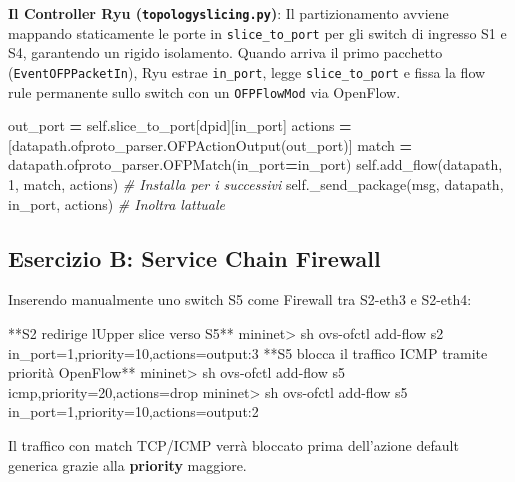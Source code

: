 \documentclass[
  italian,
  openany]{book}
\newenvironment{Shaded}{\begin{snugshade}}{\end{snugshade}}
\newcommand{\CommentTok}[1]{\textcolor[rgb]{0.56,0.35,0.01}{\textit{#1}}}
\newcommand{\DecValTok}[1]{\textcolor[rgb]{0.00,0.00,0.81}{#1}}
\newcommand{\ExtensionTok}[1]{#1}
\newcommand{\NormalTok}[1]{#1}
\newcommand{\OperatorTok}[1]{\textcolor[rgb]{0.81,0.36,0.00}{\textbf{#1}}}
\newcommand{\StringTok}[1]{\textcolor[rgb]{0.31,0.60,0.02}{#1}}
\newcommand{\VariableTok}[1]{\textcolor[rgb]{0.00,0.00,0.00}{#1}}
\begin{document}
\textbf{Il Controller Ryu (\texttt{topologyslicing.py})}: Il
partizionamento avviene mappando staticamente le porte in
\texttt{slice\_to\_port} per gli switch di ingresso S1 e S4, garantendo
un rigido isolamento. Quando arriva il primo pacchetto
(\texttt{EventOFPPacketIn}), Ryu estrae \texttt{in\_port}, legge
\texttt{slice\_to\_port} e fissa la flow rule permanente sullo switch
con un \texttt{OFPFlowMod} via OpenFlow.

\begin{Shaded}
\begin{Highlighting}[]
\NormalTok{out\_port }\OperatorTok{=} \VariableTok{self}\NormalTok{.slice\_to\_port[dpid][in\_port]}
\NormalTok{actions }\OperatorTok{=}\NormalTok{ [datapath.ofproto\_parser.OFPActionOutput(out\_port)]}
\NormalTok{match }\OperatorTok{=}\NormalTok{ datapath.ofproto\_parser.OFPMatch(in\_port}\OperatorTok{=}\NormalTok{in\_port)}
\VariableTok{self}\NormalTok{.add\_flow(datapath, }\DecValTok{1}\NormalTok{, match, actions) }\CommentTok{\# Installa per i successivi}
\VariableTok{self}\NormalTok{.\_send\_package(msg, datapath, in\_port, actions) }\CommentTok{\# Inoltra l\textquotesingle{}attuale}
\end{Highlighting}
\end{Shaded}

\subsection{Esercizio B: Service Chain
Firewall}\label{esercizio-b-service-chain-firewall}

Inserendo manualmente uno switch S5 come Firewall tra S2-eth3 e S2-eth4:

\begin{Shaded}
\begin{Highlighting}[]
\ExtensionTok{**S2}\NormalTok{ redirige l}\StringTok{\textquotesingle{}Upper slice verso S5**}
\StringTok{mininet\textgreater{} sh ovs{-}ofctl add{-}flow s2 in\_port=1,priority=10,actions=output:3}
\StringTok{**S5 blocca il traffico ICMP tramite priorità OpenFlow**}
\StringTok{mininet\textgreater{} sh ovs{-}ofctl add{-}flow s5 icmp,priority=20,actions=drop}
\StringTok{mininet\textgreater{} sh ovs{-}ofctl add{-}flow s5 in\_port=1,priority=10,actions=output:2}
\end{Highlighting}
\end{Shaded}

Il traffico con match TCP/ICMP verrà bloccato prima dell'azione default
generica grazie alla \textbf{priority} maggiore.
\end{document}
